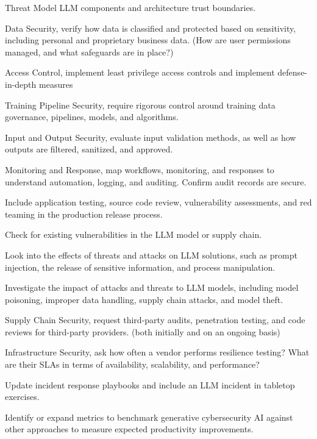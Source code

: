 \begin{minipage}{\linewidth}
\begin{checklist}
  \item Threat Model LLM components and architecture trust boundaries.
  \item Data Security, verify how data is classified and protected based on
  sensitivity, including personal and proprietary business data. (How are user
  permissions managed, and what safeguards are in place?)
  \item Access Control, implement least privilege access controls and implement
  defense-in-depth measures
  \item Training Pipeline Security, require rigorous control around training
  data governance, pipelines, models, and algorithms.
  \item Input and Output Security, evaluate input validation methods, as well
  as how outputs are filtered, sanitized, and approved.
  \item Monitoring and Response, map workflows, monitoring, and responses to
  understand automation, logging, and auditing. Confirm audit records are secure.
  \item Include application testing, source code review, vulnerability
  assessments, and red teaming in the production release process.
  \item Check for existing vulnerabilities in the LLM model or supply chain.
  \item Look into the effects of threats and attacks on LLM solutions, such as
  prompt injection, the release of sensitive information, and process
  manipulation.
  \item Investigate the impact of attacks and threats to LLM models, including
  model poisoning, improper data handling, supply chain attacks, and model theft.
  \item Supply Chain Security, request third-party audits, penetration testing,
  and code reviews for third-party providers. (both initially and on an ongoing
  basis)
  \item Infrastructure Security, ask how often a vendor performs resilience
  testing? What are their SLAs in terms of availability, scalability, and
  performance?
  \item Update incident response playbooks and include an LLM incident in
  tabletop exercises.
  \item Identify or expand metrics to benchmark generative cybersecurity AI
  against other approaches to measure expected productivity improvements.
\end{checklist}
\end{minipage}

